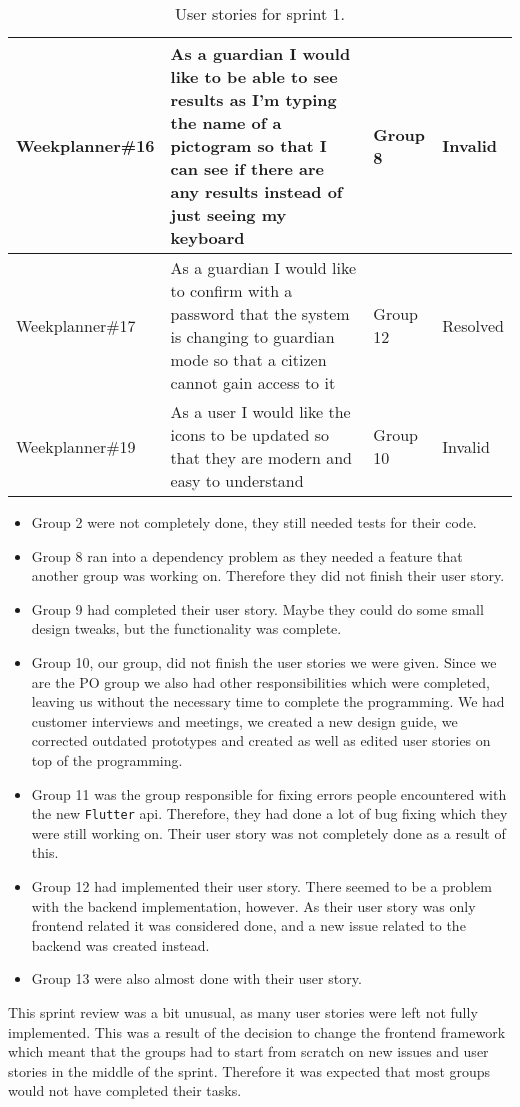 \begin{table}[H]
\begin{tabular}{|p{2.8cm}|p{7cm}|p{2cm}|p{1.5cm}|}
    Weekplanner\#16 & As a guardian I would like to be able to see results as I'm typing the name of a pictogram so that I can see if there are any results instead of just seeing my keyboard & Group 8         & Invalid    \\ \hline
    Weekplanner\#17 & As a guardian I would like to confirm with a password that the system is changing to guardian mode so that a citizen cannot gain access to it                            & Group 12        & Resolved   \\ \hline
    Weekplanner\#19 & As a user I would like the icons to be updated so that they are modern and easy to understand                                                                            & Group 10        & Invalid    \\ \hline
    \end{tabular}
    \caption{User stories for sprint 1.}\label{table:user-stories-sprint-1-review}
\end{table}

\begin{itemize}
    \item Group 2 were not completely done, they still needed tests for their code.
    \item Group 8 ran into a dependency problem as they needed a feature that another group was working on. Therefore they did not finish their user story.
    \item Group 9 had completed their user story. Maybe they could do some small design tweaks, but the functionality was complete.
    \item Group 10, our group, did not finish the user stories we were given. Since we are the PO group we also had other responsibilities which were completed, leaving us without the necessary time to complete the programming. We had customer interviews and meetings, we created a new design guide, we corrected outdated prototypes and created as well as edited user stories on top of the programming.
    \item Group 11 was the group responsible for fixing errors people encountered with the new \texttt{Flutter} api. Therefore, they had done a lot of bug fixing which they were still working on. Their user story was not completely done as a result of this.
    \item Group 12 had implemented their user story. There seemed to be a problem with the backend implementation, however. As their user story was only frontend related it was considered done, and a new issue related to the backend was created instead.
    \item Group 13 were also almost done with their user story.
\end{itemize}
\noindent
This sprint review was a bit unusual, as many user stories were left not fully implemented. This was a result of the decision to change the frontend framework which meant that the groups had to start from scratch on new issues and user stories in the middle of the sprint.
Therefore it was expected that most groups would not have completed their tasks.
